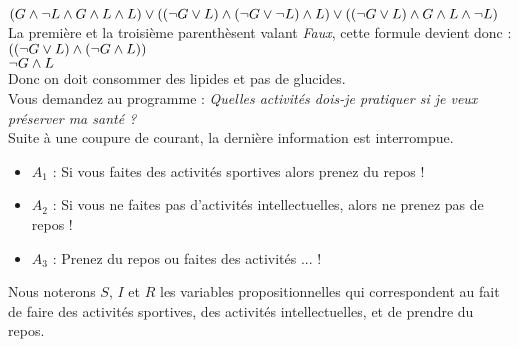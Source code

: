 \documentclass[11pt,a4paper]{article}
\begin{document}
\begin{Exercise}[title = {Logique et calcul des propositions}, origin = {\bac \; {\sc ccp 2015}}]
{		$(G \wedge \neg L \wedge G \wedge L \wedge L) \vee ((\neg G \vee L) \wedge (\neg G \vee \neg L) \wedge L) \vee ((\neg G \vee L) \wedge G \wedge L \wedge \neg L)$\\
		La première et la troisième parenthèsent valant \textit{Faux}, cette formule devient donc : \\
		$((\neg G \vee L) \wedge (\neg G \wedge L))$\\
		$\neg G \wedge L$\\
		Donc on  doit  consommer des lipides et pas de glucides.
	}
	\ExePart[name = Deuxième cas]\\
	Vous demandez au programme : \textit{\og{} Quelles activités dois-je pratiquer si je veux préserver ma santé ?\fg{}}\\
	Suite à une coupure de courant, la dernière information est interrompue.
	\begin{itemize}
		\item[] $A_1$ : Si vous faites des activités sportives alors prenez du repos !
		\item[] $A_2$ : Si vous ne faites pas d'activités intellectuelles, alors ne prenez pas de repos !
		\item[] $A_3$ : Prenez du repos ou faites des activités ... !
	\end{itemize}
	Nous noterons $S$,  $I$ et $R$ les variables propositionnelles qui correspondent au fait de faire des activités sportives, des activités intellectuelles, et de prendre du repos.
\end{Exercise}
\end{document}

